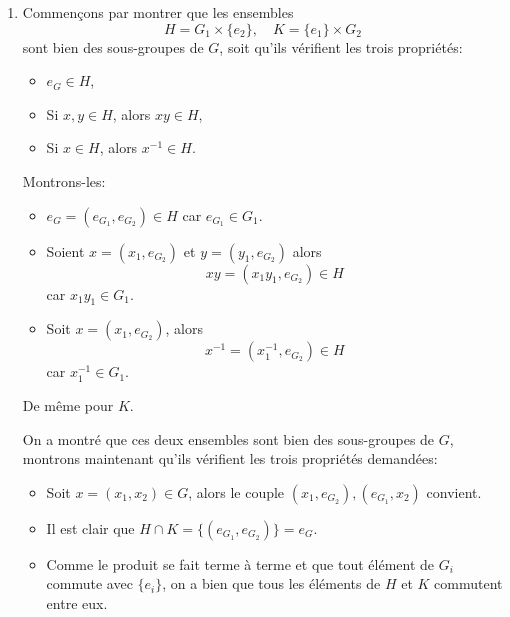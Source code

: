 {\begin{td-sol}[]
\begin{enumerate}
            \item Commençons par montrer que les ensembles 
            \begin{equation*}
                H = G_1\times\{e_2\},\quad  K = \{e_1\}\times G_2
            \end{equation*}
            sont bien des sous-groupes de \(G\), soit qu'ils vérifient
            les trois propriétés:
            \begin{itemize}
                \item \(e_G\in H\),
                \item Si \(x,y\in H\), alors \(xy\in H\),
                \item Si \(x\in H\), alors \(x^{-1}\in H\).
            \end{itemize}
            Montrons-les:
            \begin{itemize}
                \item \(e_G = (e_{G_1}, e_{G_2})\in H\) car \(e_{G_1}\in G_1\).

                \item Soient \(x=(x_1, e_{G_2})\) et \(y=(y_1, e_{G_2})\) alors
                \begin{equation*}
                    xy = (x_1y_1, e_{G_2})\in H
                \end{equation*}
                car \(x_1y_1\in G_1\).

                \item Soit \(x=(x_1, e_{G_2})\), alors
                \begin{equation*}
                    x^{-1} = (x_1^{-1}, e_{G_2})\in H
                \end{equation*}
                car \(x_1^{-1}\in G_1\).
            \end{itemize}
            De même pour \(K\).

            On a montré que ces deux ensembles sont bien des sous-groupes
            de \(G\), montrons maintenant qu'ils vérifient les trois propriétés
            demandées:
            \begin{itemize}[label=\((i)\)]
                \item Soit \(x=(x_1, x_2)\in G\), alors 
                le couple \((x_1, e_{G_2}), (e_{G_1}, x_2)\) convient.

                \item Il est clair que \(H\cap K = \{(e_{G_1}, e_{G_2})\} = e_G\).

                \item Comme le produit se fait terme à terme et que tout 
                élément de \(G_i\) commute avec \(\{e_i\}\), on a bien que
                tous les éléments de \(H\) et \(K\) commutent entre eux.
            \end{itemize}


\end{enumerate}
\end{td-sol}}
